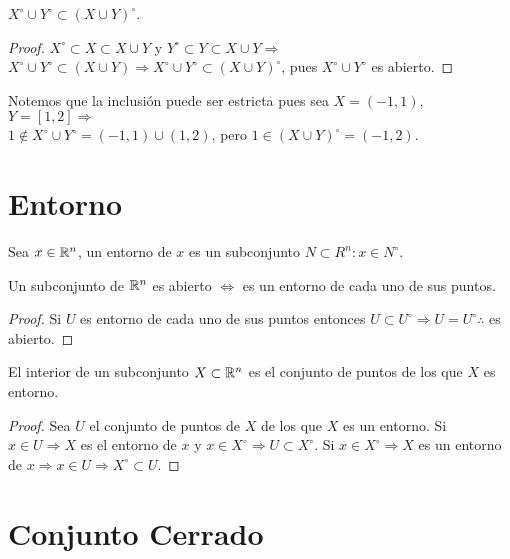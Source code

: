 \begin{prop}
  \(X^{\circ} \cup Y^{\circ} \subset {(X \cup Y)}^{\circ} \).
  \begin{proof}
    \(X^{\circ} \subset X \subset X \cup Y\) y \(Y^{\circ} \subset Y \subset X \cup Y \Rightarrow \) \\
    \(X^{\circ} \cup Y^{\circ} \subset {(X \cup Y)} \Rightarrow X^{\circ} \cup Y^{\circ} \subset {(X \cup Y)}^{\circ} \), pues \(X^{\circ} \cup Y^{\circ} \) es abierto.
  \end{proof}
\end{prop}

Notemos que la inclusión puede ser estricta pues sea \(X = (-1, 1)\), \(Y = [1, 2] \Rightarrow \) \\
\(1 \notin X^{\circ} \cup Y^{\circ} = (-1, 1) \cup (1, 2)\), pero \(1 \in {(X \cup Y)}^{\circ} = (-1, 2)\).

\section{Entorno}

\begin{definition}[Entorno]
  Sea \(x \in \mathbb{R}^n\), un entorno de \(x\) es un subconjunto \(N \subset R^n : x \in N^{\circ} \).
\end{definition}

\begin{prop}
  Un subconjunto de \(\mathbb{R}^n\) es abierto \(\iff \) es un entorno de cada uno de sus puntos.
  \begin{proof}
    Si \(U\) es entorno de cada uno de sus puntos entonces \(U \subset U^{\circ} \Rightarrow U = U^{\circ} \therefore \) es abierto.
  \end{proof}
\end{prop}

\begin{prop}
  El interior de un subconjunto \(X \subset \mathbb{R}^n\) es el conjunto de puntos de los que \(X\) es entorno.
  \begin{proof}
    Sea \(U\) el conjunto de puntos de \(X\) de los que \(X\) es un entorno. Si \(x \in U \Rightarrow X\) es el entorno de \(x\) y \(x \in X^{\circ} \Rightarrow U \subset X^{\circ} \). Si \(x \in X^{\circ} \Rightarrow X\) es un entorno de \(x \Rightarrow x \in U \Rightarrow X^{\circ} \subset U\).
  \end{proof}
\end{prop}

\section{Conjunto Cerrado}

